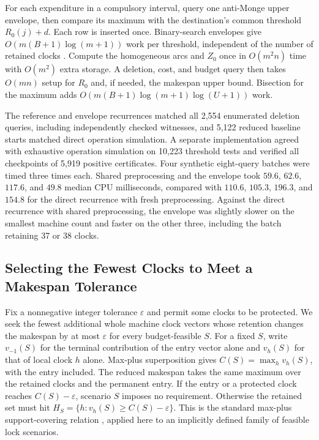 \documentclass[11pt,letterpaper]{article}
\begin{document}
For each expenditure in a compulsory interval, query one anti-Monge upper envelope, then compare its maximum with the destination's common threshold $R_0(j)+d$. Each row is inserted once. Binary-search envelopes give $O(m(B+1)\log(m+1))$ work per threshold, independent of the number of retained clocks \citep[with online triangular matrix search yielding the corresponding $O(m(B+1))$ theoretical bound;][]{Galil1990}. Compute the homogeneous arcs and $Z_0$ once in $O(m^2n)$ time with $O(m^2)$ extra storage. A deletion, cost, and budget query then takes $O(mn)$ setup for $R_0$ and, if needed, the makespan upper bound. Bisection for the maximum adds $O(m(B+1)\log(m+1)\log(U+1))$ work.

The reference and envelope recurrences matched all 2,554 enumerated deletion queries, including independently checked witnesses, and 5,122 reduced baseline starts matched direct operation simulation. A separate implementation agreed with exhaustive operation simulation on 10,223 threshold tests and verified all checkpoints of 5,919 positive certificates. Four synthetic eight-query batches were timed three times each. Shared preprocessing and the envelope took $59.6$, $62.6$, $117.6$, and $49.8$ median CPU milliseconds, compared with $110.6$, $105.3$, $196.3$, and $154.8$ for the direct recurrence with fresh preprocessing. Against the direct recurrence with shared preprocessing, the envelope was slightly slower on the smallest machine count and faster on the other three, including the batch retaining 37 or 38 clocks.

\subsection{Selecting the Fewest Clocks to Meet a Makespan Tolerance}

Fix a nonnegative integer tolerance $\varepsilon$ and permit some clocks to be protected. We seek the fewest additional whole machine clock vectors whose retention changes the makespan by at most $\varepsilon$ for every budget-feasible $S$. For a fixed $S$, write $v_{-1}(S)$ for the terminal contribution of the entry vector alone and $v_h(S)$ for that of local clock $h$ alone. Max-plus superposition gives $C(S)=\max_h v_h(S)$, with the entry included. The reduced makespan takes the same maximum over the retained clocks and the permanent entry. If the entry or a protected clock reaches $C(S)-\varepsilon$, scenario $S$ imposes no requirement. Otherwise the retained set must hit $H_S=\{h:v_h(S)\ge C(S)-\varepsilon\}$. This is the standard max-plus support-covering relation \citep{Tsiamis2018}, applied here to an implicitly defined family of feasible lock scenarios.
\end{document}

